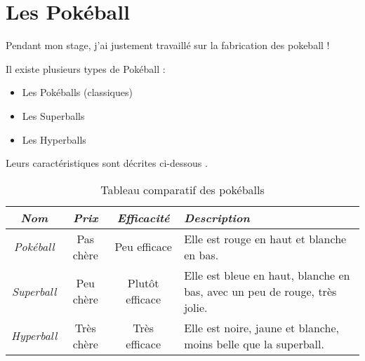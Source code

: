 \documentclass[../main.tex]{subfiles}
\begin{document}
\section{Les Pokéball}

Pendant mon stage, j'ai justement travaillé sur la fabrication des pokeball !

Il existe plusieurs types de Pokéball :
\begin{itemize}
  \item Les Pokéballs (classiques)
  \item Les Superballs
  \item Les Hyperballs
\end{itemize}

Leurs caractéristiques sont décrites ci-dessous \tabref{\ref{tab:pokeballs}}.

\begin{table}[!h]
  \captionsetup{font=small,labelfont=bf, justification=centering}
  \caption{Tableau comparatif des pokéballs}
  \label{tab:pokeballs}
\begin{center}
  \begin{tabular}{S S S m{10cm}}
    \hline
    \emph{Nom} & \emph{Prix} & \emph{Efficacité} & \emph{Description}                                                                                                                                                              \\
    \hline
    \emph{Pokéball}     & Pas chère         & Peu efficace      & Elle est rouge en haut et blanche en bas.                                                                            \\
    \hline
    \emph{Superball}    & Peu chère & Plutôt efficace   & Elle est bleue en haut, blanche en bas, avec un peu de rouge, très jolie.                                                             \\
    \hline
    \emph{Hyperball}    & Très chère        & Très efficace     & Elle est noire, jaune et blanche, moins belle que la superball. \\
    \hline
  \end{tabular}
\end{center}
\end{table}
\end{document}
